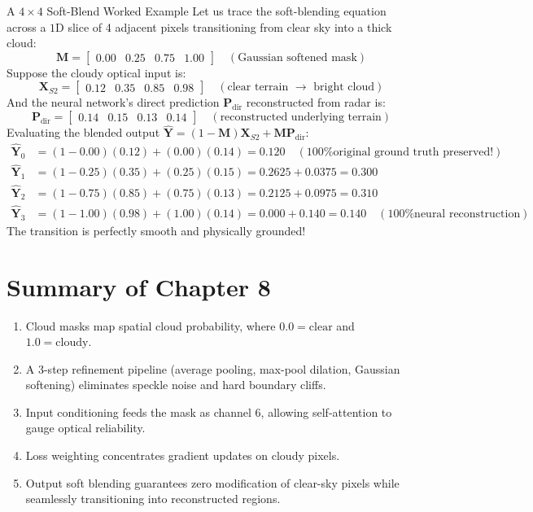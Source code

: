 \begin{mathbox}{A $4 \times 4$ Soft-Blend Worked Example}
Let us trace the soft-blending equation across a $1\text{D}$ slice of 4 adjacent pixels transitioning from clear sky into a thick cloud:
\[
\mathbf{M} = \begin{bmatrix} 0.00 & 0.25 & 0.75 & 1.00 \end{bmatrix} \quad (\text{Gaussian softened mask})
\]
Suppose the cloudy optical input is:
\[
\mathbf{X}_{S2} = \begin{bmatrix} 0.12 & 0.35 & 0.85 & 0.98 \end{bmatrix} \quad (\text{clear terrain } \to \text{ bright cloud})
\]
And the neural network's direct prediction $\mathbf{P}_{\text{dir}}$ reconstructed from radar is:
\[
\mathbf{P}_{\text{dir}} = \begin{bmatrix} 0.14 & 0.15 & 0.13 & 0.14 \end{bmatrix} \quad (\text{reconstructed underlying terrain})
\]
Evaluating the blended output $\hat{\mathbf{Y}} = (1 - \mathbf{M})\mathbf{X}_{S2} + \mathbf{M}\mathbf{P}_{\text{dir}}$:
\begin{align*}
\hat{\mathbf{Y}}_0 &= (1 - 0.00)(0.12) + (0.00)(0.14) = \mathbf{0.120} \quad (\text{100\% original ground truth preserved!}) \\
\hat{\mathbf{Y}}_1 &= (1 - 0.25)(0.35) + (0.25)(0.15) = 0.2625 + 0.0375 = \mathbf{0.300} \\
\hat{\mathbf{Y}}_2 &= (1 - 0.75)(0.85) + (0.75)(0.13) = 0.2125 + 0.0975 = \mathbf{0.310} \\
\hat{\mathbf{Y}}_3 &= (1 - 1.00)(0.98) + (1.00)(0.14) = 0.000 + 0.140 = \mathbf{0.140} \quad (\text{100\% neural reconstruction})
\end{align*}
The transition is perfectly smooth and physically grounded!
\end{mathbox}

\section{Summary of Chapter 8}
\begin{enumerate}
    \item Cloud masks map spatial cloud probability, where $0.0 = \text{clear}$ and $1.0 = \text{cloudy}$.
    \item A 3-step refinement pipeline (average pooling, max-pool dilation, Gaussian softening) eliminates speckle noise and hard boundary cliffs.
    \item Input conditioning feeds the mask as channel 6, allowing self-attention to gauge optical reliability.
    \item Loss weighting concentrates gradient updates on cloudy pixels.
    \item Output soft blending guarantees zero modification of clear-sky pixels while seamlessly transitioning into reconstructed regions.
\end{enumerate}

